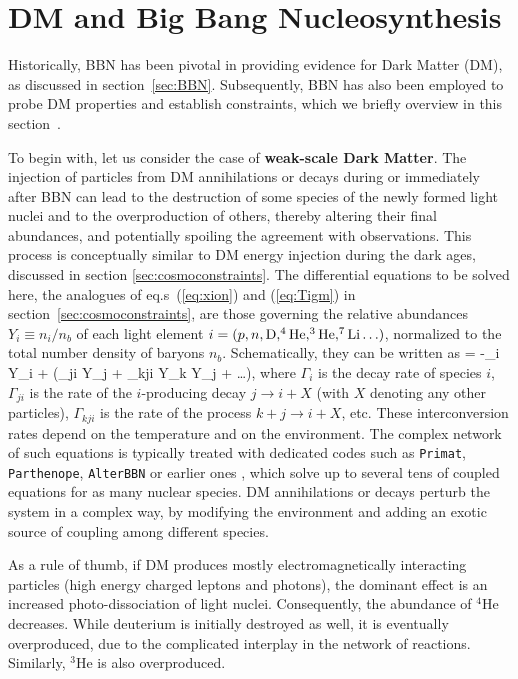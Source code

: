 \section{DM and Big Bang Nucleosynthesis}
\label{sec:BBNconstraints}
Historically, BBN 
has been pivotal in providing evidence for Dark Matter (DM), as discussed in section~\ref{sec:BBN}. 
Subsequently, BBN has also been employed to probe DM properties and establish constraints, which we briefly overview in this section~\cite{BBNbounds}.

\medskip


To begin with, let us consider the case of {\bf weak-scale Dark Matter}. The injection of particles from DM annihilations or decays during or immediately after BBN  
can lead to the destruction of some species of the newly formed light nuclei and to the overproduction of others, thereby altering their final abundances, and potentially spoiling the agreement with observations.
 This process is conceptually similar to DM energy injection during the dark ages,
 discussed in section \ref{sec:cosmoconstraints}. The differential equations to be solved here, the analogues of eq.s~(\ref{eq:xion}) and (\ref{eq:Tigm}) in section~\ref{sec:cosmoconstraints}, 
are those governing the relative abundances $Y_i \equiv n_i/n_b$ of each light element $i = (p, n, {\rm D}, ^4{\rm He}, ^3{\rm He}, ^7{\rm Li} \ldots)$, normalized to the total number density of baryons $n_b$.
Schematically, they can be written as
\beq
{} = -\Gamma_i Y_i + \sum \left(\Gamma_{ji} Y_j + \Gamma_{kji} Y_k Y_j + \ldots \right),
\eeq
where $\Gamma_i$ is the decay rate of species $i$, $\Gamma_{ji}$ is the rate of the $i$-producing decay $j \to i+X$ (with $X$ denoting any other particles), $\Gamma_{kji}$ is the rate of the process $k + j \to i + X$, etc. These interconversion rates depend on the temperature and on the environment. 
The complex network of such equations is typically treated with dedicated codes such as {\tt Primat}, {\tt Parthenope}, {\tt AlterBBN} or earlier ones \cite{BBNcodes}, which solve up to several tens of coupled equations for as many nuclear species. 
DM annihilations or decays perturb the system in a complex way, by modifying the environment and adding an exotic source of coupling among different species.


As a rule of thumb, if DM produces mostly electromagnetically interacting particles (high energy charged leptons and photons), the dominant effect is an increased photo-dissociation of light nuclei. Consequently, the abundance of $^4$He decreases. 
While deuterium is initially destroyed as well, it is eventually overproduced, due to the complicated interplay in the network of reactions. Similarly, $^3$He is also overproduced. 

